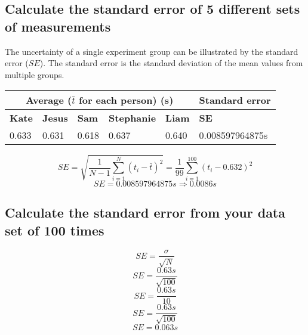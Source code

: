 \documentclass[11pt, letterpaper, includehead]{article}
\begin{document}
\subsection{Calculate the standard error of 5 different sets of measurements}

The uncertainty of a single experiment group can be illustrated by the standard
error ($SE$). The standard error is the standard deviation of the mean values
from multiple groups.
\begin{center}
  \begin{tabular}{|   m{2cm}  |  m{2cm}  |  m{2cm}  |  m{2cm}  |  m{2cm}  |  m{3cm} | }
    \hline
    \multicolumn{5}{|c|}{\textbf{Average ($\bar{t}$ for each person) (s)}} & \multicolumn{1}{l|}{\textbf{Standard error}}\\
    \hline
    \textbf{Kate} & \textbf{Jesus} & \textbf{Sam} & \textbf{Stephanie} & \textbf{Liam} & \textbf{SE}  \\
    \hline
    0.633         & 0.631          & 0.618        & 0.637              & 0.640 & 0.008597964875s \\  %
    \hline
  \end{tabular}
\end{center}


$$SE = \sqrt{\frac{1}{N - 1}\sum_{i = 1}^{N}(t_i-\bar{t})^2} = \frac{1}{99}\sum_{i = 1}^{100}(t_i - 0.632)^2$$
$$SE = 0.008597964875s \Rightarrow \boxed{0.0086s}$$

\subsection{Calculate the standard error from your data set of 100 times}


$$SE = \frac{\sigma}{\sqrt{N}}$$
$$SE = \frac{0.63s}{\sqrt{100}}$$
$$SE = \frac{0.63s}{10}$$
$$SE = \frac{0.63s}{\sqrt{100}}$$
$$SE = \boxed{0.063s}$$
\end{document}
